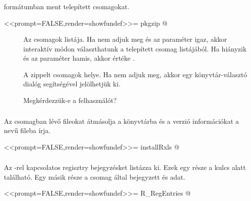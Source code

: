\subsubsection{}
 formátumban ment telepített  csomagokat.
\begin{Rnw}
<<prompt=FALSE,render=showfundef>>=
pkgzip
@
\end{Rnw}
\begin{description}
\item[] Az  csomagok listája. Ha nem adjuk meg és
  az  
  paraméter igaz, akkor interaktív módon választhatunk a telepített
  csomag listájából. Ha hiányzik és az  paraméter 
  hamis, akkor értéke .
\item[] A zippelt csomagok helye. Ha nem adjuk meg, akkor egy könyvtár-választó dialóg segítségével jelölhetjük ki.
\item[] Megkérdezzük-e a felhasználót?
\end{description}

\subsubsection{}

Az  csomagban lévő  fileokat átmásolja a
 könyvtárba és a verzió információkat a 
nevű fileba írja. 
\begin{Rnw}
<<prompt=FALSE,render=showfundef>>=
installRxls
@
\end{Rnw}

\subsubsection{}
Az -rel kapcsolatos regisztry bejegyzésket listázza ki. Ezek
egy része a 
kulcs alatt található. Egy másik része a  csomag által bejegyzett
 és  adat. 
\begin{Rnw}
<<prompt=FALSE,render=showfundef>>=
R_RegEntries
@
\end{Rnw}

